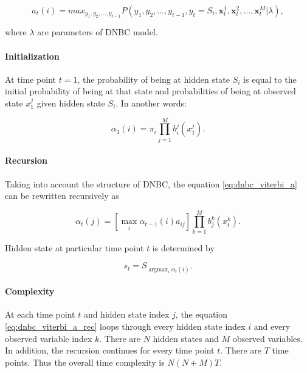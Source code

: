 \documentclass[thesis=B,english]{FITthesis}[2012/06/26]
\DeclareMathOperator*{\argmax}{argmax} %
\begin{document}
\begin{equation} \label{eq:dnbc_viterbi_a}
a_t(i) = max_{y_1,y_2,\dots,y_{t-1}} P(y_1,y_2,\dots,y_{t-1},y_t = S_i,\textbf{x}_t^1,\textbf{x}_t^2,\dots,\textbf{x}_t^M| \lambda),
\end{equation}

where $\lambda$ are parameters of DNBC model.

\paragraph{Initialization}

At time point $t=1$, the probability of being at hidden state $S_i$ is equal to the initial probability of being at that state and probabilities of being at observed state $x_1^j$ given hidden state $S_i$. In another words:

\begin{equation}
\alpha_1(i) = \pi_i \prod_{j=1}^M b^j_i(x^j_1).
\end{equation}

\paragraph{Recursion}
Taking into account the structure of DNBC, the equation \ref{eq:dnbc_viterbi_a} can be rewritten recursively as

\begin{equation} \label{eq:dnbc_viterbi_a_rec}
\alpha_t(j) = [\max_i \alpha_{t-1}(i)a_{ij}] \prod_{k=1}^M b_j^k(x^k_t).
\end{equation}

Hidden state at particular time point $t$ is determined by

\begin{equation}
s_t = S_{\argmax_i \alpha_{t}(i)}.
\end{equation}

\paragraph{Complexity}

At each time point $t$ and hidden state index $j$, the equation \ref{eq:dnbc_viterbi_a_rec} loops through every hidden state index $i$ and every observed variable index $k$. There are $N$ hidden states and $M$ observed variables. In addition, the recursion continues for every time point $t$. There are $T$ time points. Thus the overall time complexity is
$N(N+M) T$.
\end{document}

